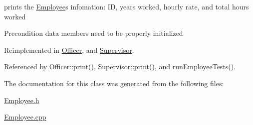 prints the \hyperlink{classEmployee}{Employee}\textquotesingle{}s infomation\+: ID, years worked, hourly rate, and total hours worked \begin{DoxyPrecond}{Precondition}
data members need to be properly initialized 
\end{DoxyPrecond}


Reimplemented in \hyperlink{classOfficer_aeadece05a1a0b7fb29bd412830d2e07a}{Officer}, and \hyperlink{classSupervisor_a92483dc9a54904d79b46c6ec4efb3f54}{Supervisor}.



Referenced by Officer\+::print(), Supervisor\+::print(), and run\+Employee\+Tests().



The documentation for this class was generated from the following files\+:\begin{DoxyCompactItemize}
\item 
\hyperlink{Employee_8h}{Employee.\+h}\item 
\hyperlink{Employee_8cpp}{Employee.\+cpp}\end{DoxyCompactItemize}
